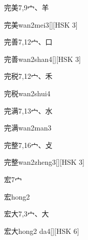 \begin{Entry}{完美}{7,9}{⼧、⽺}
  \begin{Phonetics}{完美}{wan2mei3}[][HSK 3]
  \end{Phonetics}
\end{Entry}

\begin{Entry}{完善}{7,12}{⼧、⼝}
  \begin{Phonetics}{完善}{wan2shan4}[][HSK 3]
  \end{Phonetics}
\end{Entry}

\begin{Entry}{完税}{7,12}{⼧、⽲}
  \begin{Phonetics}{完税}{wan2shui4}
  \end{Phonetics}
\end{Entry}

\begin{Entry}{完满}{7,13}{⼧、⽔}
  \begin{Phonetics}{完满}{wan2man3}
  \end{Phonetics}
\end{Entry}

\begin{Entry}{完整}{7,16}{⼧、⽁}
  \begin{Phonetics}{完整}{wan2zheng3}[][HSK 3]
  \end{Phonetics}
\end{Entry}

\begin{Entry}{宏}{7}{⼧}
  \begin{Phonetics}{宏}{hong2}
  \end{Phonetics}
\end{Entry}

\begin{Entry}{宏大}{7,3}{⼧、⼤}
  \begin{Phonetics}{宏大}{hong2 da4}[][HSK 6]
  \end{Phonetics}
\end{Entry}

